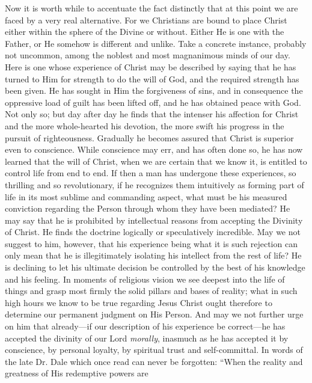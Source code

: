 \documentclass[12pt,a5paper,oneside]{book}
\begin{document}

Now it is worth while to accentuate the fact
distinctly that at this point we are faced by
a very real alternative. For we Christians are
bound to place Christ either within the sphere
of the Divine or without. Either He is one
with the Father, or He somehow is different
and unlike. Take a concrete instance, probably 
not uncommon, among the noblest and
most magnanimous minds of our day. Here
is one whose experience of Christ may be described 
by saying that he has turned to Him for
strength to do the will of God, and the required
strength has been given. He has sought in
Him the forgiveness of sins, and in consequence
the oppressive load of guilt has been lifted off,
and he has obtained peace with God. Not
only so; but day after day he finds that the
intenser his affection for Christ and the more
whole-hearted his devotion, the more swift
his progress in the pursuit of righteousness.
Gradually he becomes assured that Christ is
superior even to conscience. While conscience
may err, and has often done so, he has now
learned that the will of Christ, when we are
certain that we know it, is entitled to
control life from end to end. If then a man
has undergone these experiences, so thrilling
and so revolutionary, if he recognizes them
intuitively as forming part of life in its most
sublime and commanding aspect, what must be
his measured conviction regarding the Person
through whom they have been mediated? He
may say that he is prohibited by intellectual 
reasons from accepting the Divinity
of Christ. He finds the doctrine logically or
speculatively incredible. May we not suggest
to him, however, that his experience being what
it is such rejection can only mean that he is
illegitimately isolating his intellect from the rest
of life? He is declining to let his ultimate
decision be controlled by the best of his knowledge 
and his feeling. In moments of religious
vision we see deepest into the life of things
and grasp most firmly the solid pillars and bases
of reality; what in such high hours we know
to be true regarding Jesus Christ ought therefore 
to determine our permanent judgment on
His Person. And may we not further urge
on him that already---if our description of
his experience be correct---he has accepted
the divinity of our Lord \textit{morally}, inasmuch as
he has accepted it by conscience, by personal
loyalty, by spiritual trust and self-committal.
In words of the late Dr. Dale which once read
can never be forgotten: ``When the reality
and greatness of His redemptive powers are
\end{document}
